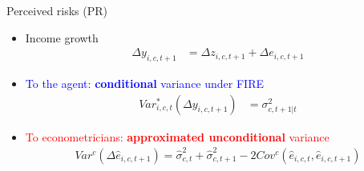 \documentclass{beamer}
\begin{document}
\begin{frame}{Perceived risks (PR)}
	\begin{itemize}
		\item Income growth 
		\begin{equation*}
			\begin{split}
				\Delta y_{i,c,t+1} & =\Delta z_{i,c,t+1} +\Delta e_{i,c,t+1} 
			\end{split}
		\end{equation*}
		\item \textcolor{blue}{To the agent: \textbf{conditional} variance under FIRE}
		\begin{equation*}
			\begin{split}
				Var^*_{i,c,t}(\Delta y_{i,c,t+1}) & =\sigma^2_{c,t+1|t}
			\end{split}
		\end{equation*}
		\item \textcolor{red}{To econometricians: \textbf{approximated unconditional} variance} 
		\begin{equation*}
			\begin{split}
				Var^c(\Delta \hat e_{i,c,t+1})     = \hat\sigma^2_{c,t}+ \hat\sigma^2_{c,t+1} - 2Cov^c(\hat e_{i,c,t},\hat e_{i,c,t+1})
			\end{split}
		\end{equation*}
		
	\end{itemize}	
\end{frame}
\end{document}
